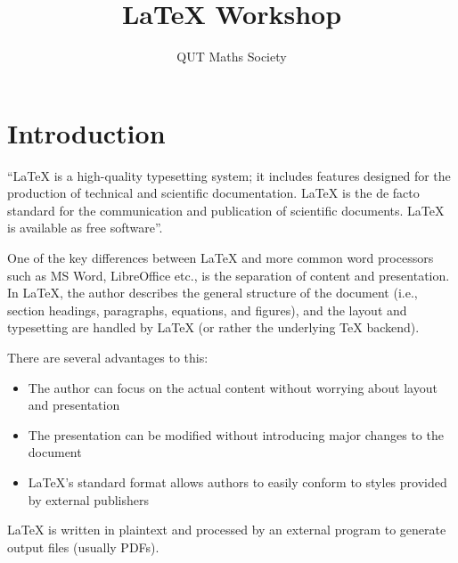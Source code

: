 \documentclass[11pt, twoside]{article}
\title{\LaTeX{} Workshop}
\author{QUT Maths Society}
\begin{document}

\maketitle


\tableofcontents

\listoffigures
\listoftables

\newpage
{}


\section{Introduction}
``\LaTeX{} is a high-quality typesetting system; it includes features designed for the production of technical and scientific documentation. \LaTeX{} is the de facto standard for the communication and publication of scientific documents. \LaTeX{} is available as free software''. \parencite{latex_project_latex}

One of the key differences between \LaTeX{} and more common word processors such as MS Word, LibreOffice etc., is the separation of content and presentation. In \LaTeX{}, the author describes the general structure of the document (i.e., section headings, paragraphs, equations, and figures), and the layout and typesetting are handled by \LaTeX{} (or rather the underlying \TeX{} backend).

There are several advantages to this:
\begin{itemize}
    \item The author can focus on the actual content without worrying about layout and presentation
    \item The presentation can be modified without introducing major changes to the document
    \item \LaTeX{}'s standard format allows authors to easily conform to styles provided by external publishers
\end{itemize}
\LaTeX{} is written in plaintext and processed by an external program to generate output files (usually PDFs).
\end{document}
